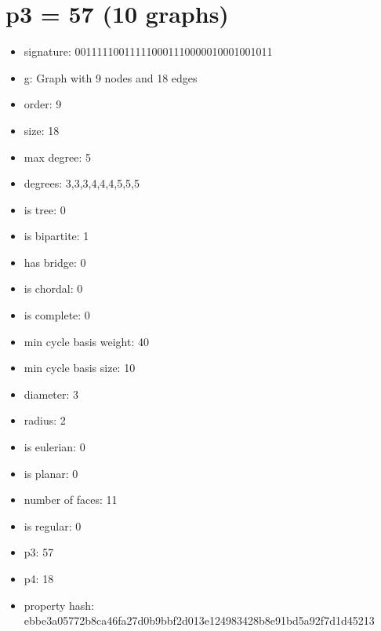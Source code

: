 \chapter{p3 = 57 (10 graphs)}
\newpage\begin{figure}
\end{figure}
\begin{itemize}
\item signature: 001111100111110001110000010001001011
\item g: Graph with 9 nodes and 18 edges
\item order: 9
\item size: 18
\item max degree: 5
\item degrees: 3,3,3,4,4,4,5,5,5
\item is tree: 0
\item is bipartite: 1
\item has bridge: 0
\item is chordal: 0
\item is complete: 0
\item min cycle basis weight: 40
\item min cycle basis size: 10
\item diameter: 3
\item radius: 2
\item is eulerian: 0
\item is planar: 0
\item number of faces: 11
\item is regular: 0
\item p3: 57
\item p4: 18
\item property hash: ebbe3a05772b8ca46fa27d0b9bbf2d013e124983428b8e91bd5a92f7d1d45213
\end{itemize}
